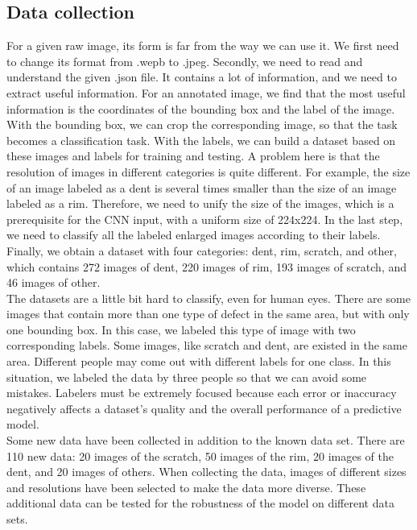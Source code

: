 \documentclass[lang=english,inputenc=utf8,fontsize=10pt]{ldvarticle}
\begin{document}
\subsection{Data collection}
For a given raw image, its form is far from the way we can use it. We first need to change its format from .wepb to .jpeg. Secondly, we need to read and understand the given .json file. It contains a lot of information, and we need to extract useful information. For an annotated image, we find that the most useful information is the coordinates of the bounding box and the label of the image. With the bounding box, we can crop the corresponding image, so that the task becomes a classification task. With the labels, we can build a dataset based on these images and labels for training and testing. A problem here is that the resolution of images in different categories is quite different. For example, the size of an image labeled as a dent is several times smaller than the size of an image labeled as a rim. Therefore, we need to unify the size of the images, which is a prerequisite for the CNN input, with a uniform size of 224x224. In the last step, we need to classify all the labeled enlarged images according to their labels. Finally, we obtain a dataset with four categories: dent, rim, scratch, and other, which contains 272 images of dent, 220 images of rim, 193 images of scratch, and 46 images of other.\\

The datasets are a little bit hard to classify, even for human eyes. There are some images that contain more than one type of defect in the same area, but with only one bounding box. In this case, we labeled this type of image with two corresponding labels. Some images, like scratch and dent, are existed in the same area. Different people may come out with different labels for one class. In this situation, we labeled the data by three people so that we can avoid some mistakes. Labelers must be extremely focused because each error or inaccuracy negatively affects a dataset’s quality and the overall performance of a predictive model.\\

Some new data have been collected in addition to the known data set. There are 110 new data: 20 images of the scratch, 50 images of the rim, 20 images of the dent, and 20  images of others. When collecting the data, images of different sizes and resolutions have been selected to make the data more diverse. These additional data can be tested for the robustness of the model on different data sets.\\
\end{document}
